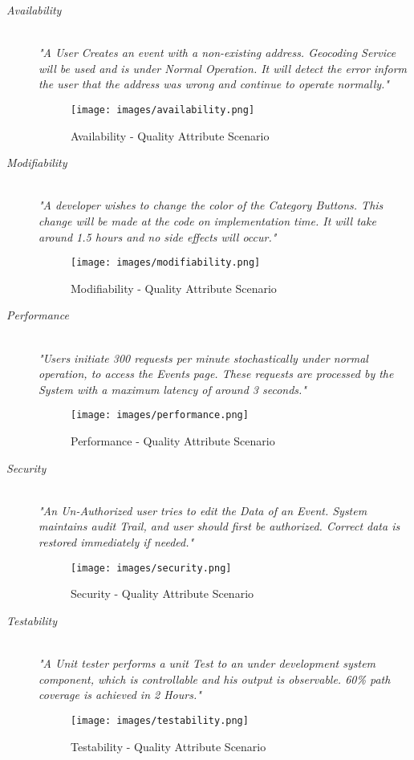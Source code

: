 \begin{description}
  \item[\emph{Availability}] \hfill \\
  \emph{"A User Creates an event with a non-existing address. Geocoding Service will be used and is under Normal Operation. It will detect the error inform the user that the address was wrong and continue to operate normally."}
  \begin{figure}[H]
  	\centering
  	\texttt{[image: images/availability.png]}
  	\caption{Availability - Quality Attribute Scenario}
  	\label{availability}
  \end{figure}
  
  \item[\emph{Modifiability}] \hfill \\
  \emph{"A developer wishes to change the color of the Category Buttons. This change will be made at the code on implementation time. It will take around 1.5 hours and no side effects will occur."}
  \begin{figure}[H]
  	\centering
  	\texttt{[image: images/modifiability.png]}
  	\caption{Modifiability - Quality Attribute Scenario}
  	\label{modifiability}
  \end{figure}
  
  \item[\emph{Performance}] \hfill \\
  \emph{"Users initiate 300 requests per minute stochastically under normal operation, to access the Events page. These requests are processed by the System with a maximum latency of around 3 seconds."}
  \begin{figure}[H]
  	\centering
  	\texttt{[image: images/performance.png]}
  	\caption{Performance - Quality Attribute Scenario}
  	\label{performance}
  \end{figure}
  
  \item[\emph{Security}] \hfill \\
  \emph{"An Un-Authorized user tries to edit the Data of an Event. System maintains audit Trail, and user should first be authorized. Correct data is restored immediately if needed."}
  \begin{figure}[H]
  	\centering
  	\texttt{[image: images/security.png]}
  	\caption{Security - Quality Attribute Scenario}
  	\label{security}
  \end{figure}
  
  \item[\emph{Testability}] \hfill \\
  \emph{"A Unit tester performs a unit Test to an under development system component, which is controllable and his output is observable. 60\% path coverage is achieved in 2 Hours."}
  \begin{figure}[H]
  	\centering
  	\texttt{[image: images/testability.png]}
  	\caption{Testability - Quality Attribute Scenario}
  	\label{testability}
  \end{figure}
  

\end{description}
